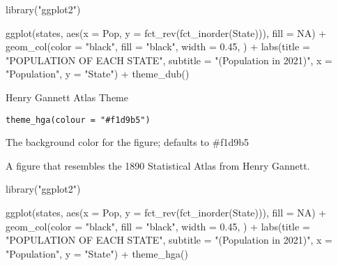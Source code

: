 \documentclass[a4paper]{book}
\begin{document}
%
\begin{Examples}
\begin{ExampleCode}
library("ggplot2")

ggplot(states, aes(x = Pop, y = fct_rev(fct_inorder(State))), fill = NA) +
geom_col(color = "black", fill = "black", width = 0.45, ) +
labs(title = "POPULATION OF EACH STATE",
    subtitle = "(Population in 2021)",
    x = "Population",
    y = "State") +
theme_dub()
\end{ExampleCode}
\end{Examples}
%
\begin{Description}\relax
Henry Gannett Atlas Theme
\end{Description}
%
\begin{Usage}
\begin{verbatim}
theme_hga(colour = "#f1d9b5")
\end{verbatim}
\end{Usage}
%
\begin{Arguments}
\begin{ldescription}
\item[\code{colour}] The background color for the figure; defaults to \#f1d9b5
\end{ldescription}
\end{Arguments}
%
\begin{Value}
A figure that resembles the 1890 Statistical Atlas from Henry Gannett.
\end{Value}
%
\begin{Examples}
\begin{ExampleCode}
library("ggplot2")

ggplot(states, aes(x = Pop, y = fct_rev(fct_inorder(State))), fill = NA) +
geom_col(color = "black", fill = "black", width = 0.45, ) +
labs(title = "POPULATION OF EACH STATE",
    subtitle = "(Population in 2021)",
    x = "Population",
    y = "State") +
theme_hga()
\end{ExampleCode}
\end{Examples}
\printindex{}
\end{document}
